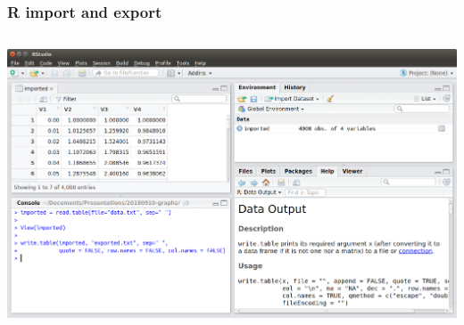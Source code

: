 \documentclass[handout, notes=hide]{beamer}
\begin{document}

\begin{frame}[fragile]
\frametitle{R import and export}
\setlength{\parskip}{0.5em}

\begin{columns}[T]
\begin{column}[T]{1.1\textwidth}
\vspace{-0.5em}

\includegraphics[width=1.0\textwidth]{rimportexport}

\end{column}
\end{columns}


\end{frame}
\note{
\setlength{\parskip}{0.5em}
}

\end{document}
